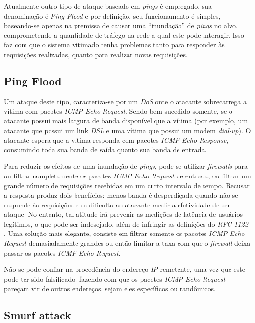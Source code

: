Atualmente outro tipo de ataque baseado em \textit{pings} é empregado, sua denominação é \textit{Ping Flood} e por definição, seu funcionamento é simples, baseando-se apenas na premissa de causar uma ``inundação'' de \textit{pings} no alvo, comprometendo a quantidade de tráfego na rede a qual este pode interagir. Isso faz com que o sistema vitimado tenha problemas tanto para responder às requisições realizadas, quanto para realizar novas requisições.



\subsection{Ping Flood}

Um ataque deste tipo, caracteriza-se por um \textit{DoS} onte o atacante sobrecarrega a vítima com pacotes \textit{ICMP Echo Request}. Sendo bem sucedido somente, se o atacante possui mais largura de banda disponível que a vítima (por exemplo, um atacante que possui um link \textit{DSL} e uma vítima que possui um modem \textit{dial-up}). O atacante espera que a vítima responda com pacotes \textit{ICMP Echo Response}, consumindo toda sua banda de saída quanto sua banda de entrada.

Para reduzir os efeitos de uma inundação de \textit{pings}, pode-se utilizar \textit{firewalls} para ou filtrar completamente os pacotes \textit{ICMP Echo Request} de entrada, ou filtrar um grande número de requisições recebidas em um curto intervalo de tempo. Recusar a resposta produz dois benefícios: menos banda é desperdiçada quando não se responde às requisições e se dificulta ao atacante medir a efetividade de seu ataque. No entanto, tal atitude irá prevenir as medições de latência de usuários legítimos, o que pode ser indesejado, além de infringir as definições do \textit{RFC 1122} \cite{RFC1122}. Uma solução mais elegante, consiste em filtrar somente os pacotes \textit{ICMP Echo Request} demasiadamente grandes ou então limitar a taxa com que o \textit{firewall} deixa passar os pacotes \textit{ICMP Echo Request}.

Não se pode confiar na procedência do endereço \textit{IP} remetente, uma vez que este pode ter sido falsificado, fazendo com que os pacotes \textit{ICMP Echo Request} pareçam vir de outros endereços, sejam eles específicos ou randômicos.


\subsection{Smurf attack}

